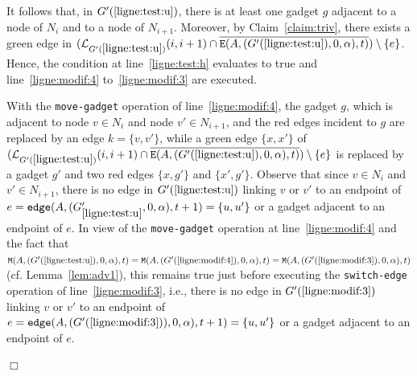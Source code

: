 \documentclass[11pt]{article}
\newcommand{\qed}{\hfill $\Box$ \bigbreak}
\newenvironment{proof}{\noindent {\bf Proof.}}{\qed}
\begin{document}
{\begin{proof}
It follows that, in $G'(\ref{ligne:test:u})$, there is at least one gadget $g$ adjacent to a node of $N_i$ and to a node of $N_{i+1}$. Moreover, by Claim~\ref{claim:triv}, there exists a green edge in $(\mathcal{L}_{G'(\ref{ligne:test:u})}(i,i+1)\cap\overline{{\tt E}(A,(G'(\ref{ligne:test:u}),0,\alpha),t)})\setminus \{e\}$. Hence, the condition at line~\ref{ligne:test:h} evaluates to true and line~\ref{ligne:modif:4} to~\ref{ligne:modif:3} are executed. 

With the {\tt move\mbox{-}gadget} operation of line~\ref{ligne:modif:4}, the gadget $g$, which is adjacent to node $v\in N_i$ and node $v'\in N_{i+1}$, and the red edges incident to $g$ are replaced by an edge $k=\{v,v'\}$, while a green edge $\{x,x'\}$ of $(\mathcal{L}_{G'(\ref{ligne:test:u})}(i,i+1)\cap\overline{{\tt E}(A,(G'(\ref{ligne:test:u}),0,\alpha),t)})\setminus \{e\}$ is replaced by a gadget $g'$ and two red edges $\{x,g'\}$ and $\{x',g'\}$. Observe that since $v\in N_i$ and $v'\in N_{i+1}$, there is no edge in $G'(\ref{ligne:test:u})$ linking $v$ or $v'$ to an endpoint of $e={\tt edge}(A,(G'_{\ref{ligne:test:u}},0,\alpha),t+1)=\{u,u'\}$ or a gadget adjacent to an endpoint of $e$. In view of the {\tt move\mbox{-}gadget} operation at line~\ref{ligne:modif:4} and the fact that ${\tt M}(A,(G'({\ref{ligne:test:u}}),0,\alpha),t)={\tt M}(A,(G'({\ref{ligne:modif:4}}),0,\alpha),t)={\tt M}(A,(G'({\ref{ligne:modif:3}}),0,\alpha),t)$ (cf. Lemma~\ref{lem:adv1}), this remains true just before executing the {\tt switch\mbox{-}edge} operation of line~\ref{ligne:modif:3}, i.e., there is no edge in $G'(\ref{ligne:modif:3})$ linking $v$ or $v'$ to an endpoint of $e={\tt edge}(A,(G'(\ref{ligne:modif:3})),0,\alpha),t+1)=\{u,u'\}$ or a gadget adjacent to an endpoint of $e$. 


\end{proof}}
\end{document}
